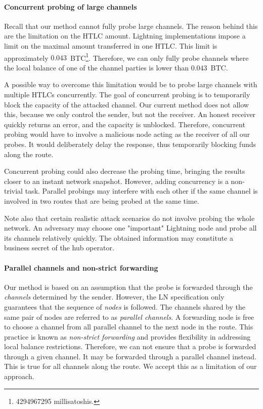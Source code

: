 \paragraph{Concurrent probing of large channels}

Recall that our method cannot fully probe large channels.
The reason behind this are the limitation on the HTLC amount.
Lightning implementations impose a limit on the maximal amount transferred in one HTLC\@.
This limit is approximately $0.043$~BTC\footnote{4294967295 millisatoshis.}.
Therefore, we can only fully probe channels where the local balance of one of the channel parties is lower than $0.043$~BTC\@.

A possible way to overcome this limitation would be to probe large channels with multiple HTLCs concurrently.
The goal of concurrent probing is to temporarily block the capacity of the attacked channel.
Our current method does not allow this, because we only control the sender, but not the receiver.
An honest receiver quickly returns an error, and the capacity is unblocked.
Therefore, concurrent probing would have to involve a malicious node acting as the receiver of all our probes.
It would deliberately delay the response, thus temporarily blocking funds along the route.

Concurrent probing could also decrease the probing time, bringing the results closer to an instant network snapshot.
However, adding concurrency is a non-trivial task.
Parallel probings may interfere with each other if the same channel is involved in two routes that are being probed at the same time.

Note also that certain realistic attack scenarios do not involve probing the whole network.
An adversary may choose one "important" Lightning node and probe all its channels relatively quickly.
The obtained information may constitute a business secret of the hub operator.


\paragraph{Parallel channels and non-strict forwarding}

Our method is based on an assumption that the probe is forwarded through the \textit{channels} determined by the sender.
However, the LN specification only guarantees that the sequence of \textit{nodes} is followed.
The channels shared by the same pair of nodes are referred to as \textit{parallel channels}.
A forwarding node is free to choose a channel from all parallel channel to the next node in the route.
This practice is known as \textit{non-strict forwarding} and provides flexibility in addressing local balance restrictions.
Therefore, we can not ensure that a probe is forwarded through a given channel.
It may be forwarded through a parallel channel instead.
This is true for all channels along the route.
We accept this as a limitation of our approach.

